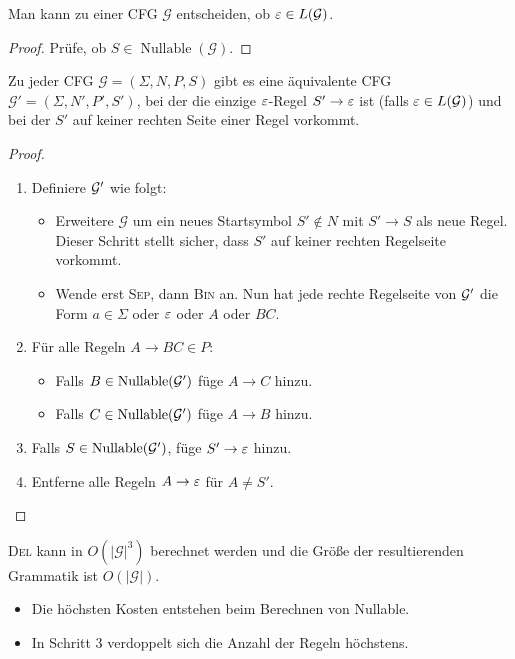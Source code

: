 \begin{Korollar}
  Man kann zu einer \ac{CFG} $\mathcal{G}$ entscheiden, ob $\varepsilon \in
  L(\mathcal{G})$.
\end{Korollar}
\begin{proof}
  Prüfe, ob $S \in \operatorname{Nullable}(\mathcal{G})$.
\end{proof}
\begin{lemma}
  Zu jeder \ac{CFG} $\mathcal{G}=(\Sigma, N, P, S)$ gibt es eine äquivalente \ac{CFG} $\mathcal{G'} =(\Sigma, N', P', S')$, bei der die einzige $\varepsilon$-Regel $S' \to \varepsilon$ ist (falls $\varepsilon \in L(\mathcal{G})$) und bei der $S'$ auf keiner rechten Seite einer Regel vorkommt.
\end{lemma}
\begin{proof}
  \hfill
  \begin{enumerate}
  \item Definiere $\mathcal{G}'$ wie folgt:
    \begin{itemize}
    \item Erweitere $\mathcal{G}$ um ein neues Startsymbol
      $S' \notin N$ mit $S' \to S$ als neue Regel.  Dieser Schritt
      stellt sicher, dass $S'$ auf keiner rechten Regelseite vorkommt.
    \item Wende erst \textsc{Sep}, dann \textsc{Bin} an.
      Nun hat jede rechte Regelseite von $\mathcal{G}'$ die Form $a \in \Sigma$ oder $\varepsilon$ oder $A$ oder $BC$.
    \end{itemize}
  \item Für alle Regeln $A \to BC \in P$:
    \begin{itemize}
    \item Falls $B \in \operatorname{Nullable}(\mathcal{G}')$ füge $A \to C$ hinzu.
    \item Falls $C \in \operatorname{Nullable}(\mathcal{G}')$ füge $A \to B$ hinzu.
    \end{itemize}
  \item Falls $S \in \operatorname{Nullable}(\mathcal{G}')$, füge $S' \to \varepsilon$ hinzu.
  \item Entferne alle Regeln $A \to \varepsilon$ für $A \neq S'$.
  \qedhere
  \end{enumerate}
\end{proof}
\begin{Bemerkung}
\textsc{Del} kann in $O(|\mathcal{G}|^3)$ berechnet werden und die Größe der resultierenden Grammatik ist $O(|\mathcal{G}|)$.
\begin{itemize}
	\item Die höchsten Kosten entstehen beim Berechnen von Nullable.
	
	\item In Schritt 3 verdoppelt sich die Anzahl der Regeln höchstens.
	\qedhere
\end{itemize}
\end{Bemerkung}

